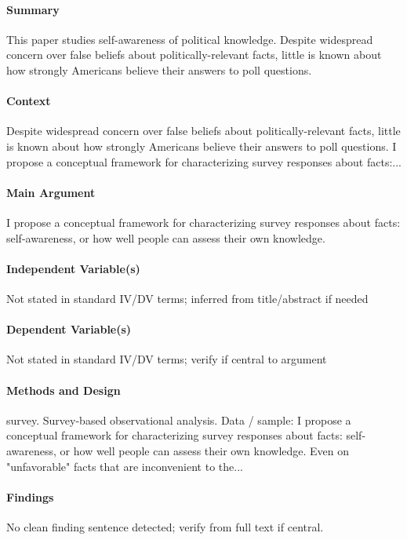 \documentclass[12pt]{article}
\begin{document}
\paragraph{Summary} This paper studies self-awareness of political knowledge. Despite widespread concern over false beliefs about politically-relevant facts, little is known about how strongly Americans believe their answers to poll questions.

\paragraph{Context} Despite widespread concern over false beliefs about politically-relevant facts, little is known about how strongly Americans believe their answers to poll questions. I propose a conceptual framework for characterizing survey responses about facts:...

\paragraph{Main Argument} I propose a conceptual framework for characterizing survey responses about facts: self-awareness, or how well people can assess their own knowledge.

\paragraph{Independent Variable(s)} Not stated in standard IV/DV terms; inferred from title/abstract if needed

\paragraph{Dependent Variable(s)} Not stated in standard IV/DV terms; verify if central to argument

\paragraph{Methods and Design} survey. Survey-based observational analysis. Data / sample: I propose a conceptual framework for characterizing survey responses about facts: self-awareness, or how well people can assess their own knowledge. Even on "unfavorable" facts that are inconvenient to the...

\paragraph{Findings} No clean finding sentence detected; verify from full text if central.
\end{document}
